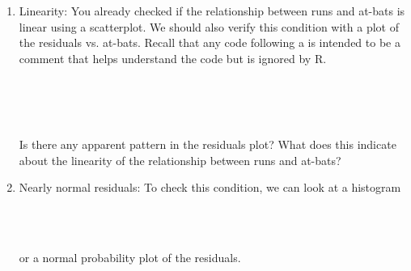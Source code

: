 \documentclass[11pt]{article}
\begin{document}
\begin{enumerate}[(1)]
\item Linearity: You already checked if the relationship between runs and at-bats is linear using a scatterplot. We should also verify this condition with a plot of the residuals vs. at-bats.  Recall that any code following a \texttt{\hlcomment{\#}} is intended to be a comment that helps understand the code but is ignored by R.

\ttfamily\noindent
\hlstd{}\hspace*{\fill}\\
\hlstd{}\hlkeyword{(}\hlargument{=}{\ }\hlkeyword{\usebox{\hlnormalsizeboxdollar}}\hlkeyword{,}{\ }\hlargument{=}{\ }\hlkeyword{\usebox{\hlnormalsizeboxdollar}}\hlkeyword{)}\hspace*{\fill}\\
\hlstd{}\hlkeyword{(}\hlargument{=}{\ }\hlkeyword{,}{\ }\hlargument{=}{\ }\hlkeyword{)}{\ }{\ }\hspace*{\fill}\\
\normalfont

\begin{exercise}
Is there any apparent pattern in the residuals plot? What does this indicate about the linearity of the relationship between runs and at-bats?
\end{exercise}

\item Nearly normal residuals: To check this condition, we can look at a histogram

\ttfamily\noindent
\hlstd{}\hspace*{\fill}\\
\hlstd{}\hlkeyword{(}\hlkeyword{\usebox{\hlnormalsizeboxdollar}}\hlkeyword{)}\hspace*{\fill}\\
\normalfont

or a normal probability plot of the residuals.

\ttfamily\noindent
\hlstd{}\hspace*{\fill}\\
\hlstd{}\hlkeyword{(}\hlkeyword{\usebox{\hlnormalsizeboxdollar}}\hlkeyword{)}\hspace*{\fill}\\
\hlstd{}\hlkeyword{(}\hlkeyword{\usebox{\hlnormalsizeboxdollar}}\hlkeyword{)}{\ }{\ }\mbox{}
\normalfont


\end{enumerate}
\end{document}
